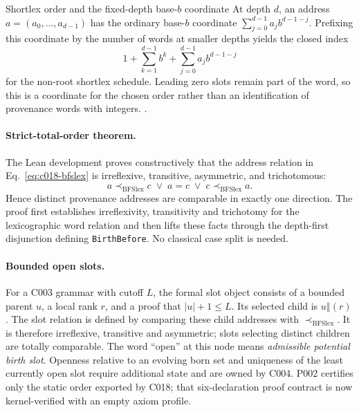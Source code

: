 \begin{cnnaInfoBox}{Shortlex order and the fixed-depth base-$b$ coordinate}
At depth $d$, an address $a=(a_0,\ldots,a_{d-1})$ has the ordinary
base-$b$ coordinate $\sum_{j=0}^{d-1}a_j b^{d-1-j}$.  Prefixing this
coordinate by the number of words at smaller depths yields the closed index
\[
  1+\sum_{k=1}^{d-1}b^k+\sum_{j=0}^{d-1}a_j b^{d-1-j}
\]
for the non-root shortlex schedule.  Leading zero slots remain part of the
word, so this is a coordinate for the chosen order rather than an
identification of provenance words with integers.
\cite[Ch.~1]{Lothaire1997CombinatoricsWords}.
\end{cnnaInfoBox}

\paragraph*{Strict-total-order theorem.}
The Lean development proves constructively that the address relation in
Eq.~\eqref{eq:c018-bfslex} is irreflexive, transitive, asymmetric, and
trichotomous:
\begin{equation}
  a\prec_{\mathrm{BFSlex}}c
  \;\lor\;
  a=c
  \;\lor\;
  c\prec_{\mathrm{BFSlex}}a.
  \label{eq:c018-trichotomy}
\end{equation}
Hence distinct provenance addresses are comparable in exactly one direction.
The proof first establishes irreflexivity, transitivity and trichotomy for the
lexicographic word relation and then lifts these facts through the depth-first
disjunction defining \texttt{BirthBefore}.  No classical case split is needed.

\paragraph*{Bounded open slots.}
For a C003 grammar with cutoff $L$, the formal slot object consists of a
bounded parent $u$, a local rank $r$, and a proof that $|u|+1\le L$.  Its
selected child is $u\mathbin{\Vert}(r)$.  The slot relation is defined by
comparing these child addresses with $\prec_{\mathrm{BFSlex}}$.  It is
therefore irreflexive, transitive and asymmetric; slots selecting distinct
children are totally comparable.  The word ``open'' at this node means
\emph{admissible potential birth slot}.  Openness relative to an evolving born set and uniqueness of the least
currently open slot require additional state and are owned by C004.  P002
certifies only the static order exported by C018; that six-declaration proof
contract is now kernel-verified with an empty axiom profile.

